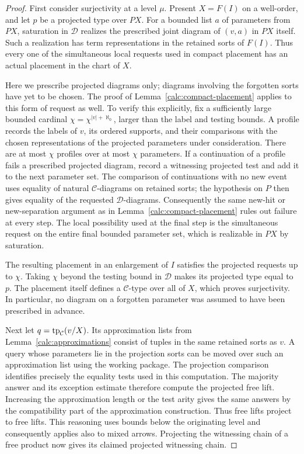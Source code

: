 \begin{proof}
First consider surjectivity at a level $\mu$. Present
$X=F(I)$ on a well-order, and let $p$ be a projected type over $PX$.
For a bounded list $a$ of parameters from $PX$, saturation in
$\mathcal D$ realizes the prescribed joint diagram of $(v,a)$ in
$PX$ itself. Such a realization has term representations in the
retained sorts of $F(I)$. Thus every one of the simultaneous local
requests used in compact placement has an actual placement in the
chart of $X$.

Here we prescribe projected diagrams only; diagrams involving the
forgotten sorts have yet to be chosen. The proof of
Lemma~\ref{calc:compact-placement} applies to this form of request as
well. To verify this explicitly, fix a sufficiently large bounded
cardinal $\chi=\chi^{|v|+\aleph_0}$, larger than the label and testing
bounds. A profile records the labels of $v$, its ordered supports,
and their comparisons with the chosen representations of the
projected parameters under consideration. There are at most $\chi$
profiles over at most $\chi$ parameters. If a continuation of a
profile fails a prescribed projected diagram, record a witnessing
projected test and add it to the next parameter set. The comparison
of continuations with no new event uses equality of natural
$\mathcal C$-diagrams on retained sorts; the hypothesis on $P$
then gives equality of the requested $\mathcal D$-diagrams.
Consequently the same new-hit or new-separation argument as in
Lemma~\ref{calc:compact-placement} rules out failure at every step.
The local possibility used at the final step is the simultaneous
request on the entire final bounded parameter set, which is
realizable in $PX$ by saturation.

The resulting placement in an enlargement of $I$ satisfies the
projected requests up to $\chi$. Taking $\chi$ beyond the testing
bound in $\mathcal D$ makes its projected type equal to $p$.
The placement itself defines a $\mathcal C$-type over all of $X$,
which proves surjectivity. In particular, no diagram on a forgotten
parameter was assumed to have been prescribed in advance.

Next let $q=\operatorname{tp}_{\mathcal C}(v/X)$. Its approximation lists from
Lemma~\ref{calc:approximations} consist of tuples in the same
retained sorts as $v$. A query whose parameters lie in the projection
sorts can be moved over such an approximation list using the
working package. The projection comparison identifies precisely
the equality tests used in this computation. The majority answer
and its exception estimate therefore compute the projected free
lift. Increasing the approximation length or the test arity gives
the same answers by the compatibility part of the approximation
construction. Thus free lifts project to free lifts. This reasoning
uses bounds below the originating level and consequently applies
also to mixed arrows. Projecting the witnessing chain of a free
product now gives its claimed projected witnessing chain.


\end{proof}
